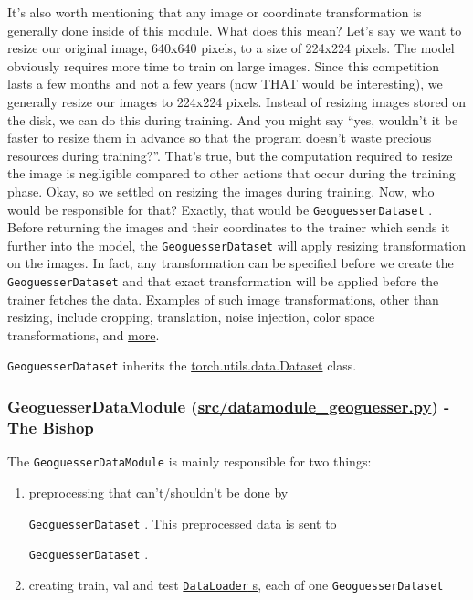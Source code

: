\documentclass[]{article}
\providecommand{\tightlist}{%
  \setlength{\itemsep}{0pt}\setlength{\parskip}{0pt}}
\let\oldtexttt\texttt
\renewcommand{\texttt}[1]{
  \textcolor{tcolor}{\colorbox{bgcolor}{\oldtexttt{#1}}}
}
\begin{document}
It's also worth mentioning that any image or coordinate transformation
is generally done inside of this module. What does this mean? Let's say
we want to resize our original image, 640x640 pixels, to a size of
224x224 pixels. The model obviously requires more time to train on large
images. Since this competition lasts a few months and not a few years
(now THAT would be interesting), we generally resize our images to
224x224 pixels. Instead of resizing images stored on the disk, we can do
this during training. And you might say ``yes, wouldn't it be faster to
resize them in advance so that the program doesn't waste precious
resources during training?''. That's true, but the computation required
to resize the image is negligible compared to other actions that occur
during the training phase. Okay, so we settled on resizing the images
during training. Now, who would be responsible for that? Exactly, that
would be \texttt{GeoguesserDataset}. Before returning the images and
their coordinates to the trainer which sends it further into the model,
the \texttt{GeoguesserDataset} will apply resizing transformation on the
images. In fact, any transformation can be specified before we create
the \texttt{GeoguesserDataset} and that exact transformation will be
applied before the trainer fetches the data. Examples of such image
transformations, other than resizing, include cropping, translation,
noise injection, color space transformations, and
\href{https://journalofbigdata.springeropen.com/articles/10.1186/s40537-019-0197-0}{more}.

\texttt{GeoguesserDataset} inherits the
\href{https://pytorch.org/tutorials/beginner/data_loading_tutorial.html}{torch.utils.data.Dataset}
class.

\hypertarget{geoguesserdatamodule-srcdatamodule_geoguesser.py---the-bishop}{%
\subsubsection{\texorpdfstring{GeoguesserDataModule
(\url{src/datamodule_geoguesser.py}) - The
Bishop}{GeoguesserDataModule (src/datamodule\_geoguesser.py) - The Bishop}}\label{geoguesserdatamodule-srcdatamodule_geoguesser.py---the-bishop}}

The \texttt{GeoguesserDataModule} is mainly responsible for two things:

\begin{enumerate}
\def\labelenumi{\arabic{enumi}.}
\tightlist
\item
  preprocessing that can't/shouldn't be done by
  \texttt{GeoguesserDataset}. This preprocessed data is sent to
  \texttt{GeoguesserDataset}.
\item
  creating train, val and test
  \href{https://pytorch.org/tutorials/beginner/basics/data_tutorial.html\#preparing-your-data-for-training-with-dataloaders}{\texttt{DataLoader}s},
  each of one \texttt{GeoguesserDataset}
\end{enumerate}
\end{document}
